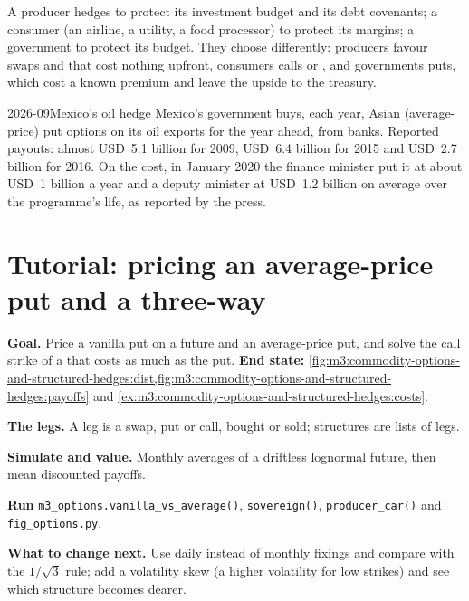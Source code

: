 A producer hedges to protect its investment budget and its debt covenants; a consumer (an airline, a
utility, a food processor) to protect its margins; a government to protect its budget. They choose
differently: producers favour swaps and  that cost nothing upfront, consumers calls or , and
governments puts, which cost a known premium and leave the upside to the treasury.

\begin{dated}{2026-09}{Mexico's oil hedge}\label{dat:m3:commodity-options-and-structured-hedges:mexico}
Mexico's government buys, each year, Asian (average-price) put options on its oil exports for the year
ahead, from banks. Reported payouts: almost USD~5.1 billion for 2009, USD~6.4 billion for 2015 and USD~2.7
billion for 2016. On the cost, in January 2020 the finance minister put it at about USD~1 billion a year and a
deputy minister at USD~1.2 billion on average over the programme's life, as reported by the press.
\end{dated}

\section{Tutorial: pricing an average-price put and a three-way}\label{tut:m3:commodity-options-and-structured-hedges:apo}

\begin{tutorial}
\textbf{Goal.} Price a vanilla put on a future and an average-price put, and solve the call strike of a
 that costs as much as the put. \textbf{End state:}
\cref{fig:m3:commodity-options-and-structured-hedges:dist,fig:m3:commodity-options-and-structured-hedges:payoffs}
and \cref{ex:m3:commodity-options-and-structured-hedges:costs}.
\begin{tutsteps}
\item \textbf{The legs.} A leg is a swap, put or call, bought or sold; structures are lists of legs.
\label{lst:m3:commodity-options-and-structured-hedges:legs}
\item \textbf{Simulate and value.} Monthly averages of a driftless lognormal future, then mean discounted
payoffs.
\label{lst:m3:commodity-options-and-structured-hedges:value}
\item \textbf{Run} \texttt{m3\_options.vanilla\_vs\_average()}, \texttt{sovereign()},
\texttt{producer\_car()} and \texttt{fig\_options.py}.
\end{tutsteps}
\textbf{What to change next.} Use daily instead of monthly fixings and compare with the $1/\sqrt3$ rule;
add a volatility skew (a higher volatility for low strikes) and see which structure becomes dearer.
\end{tutorial}

